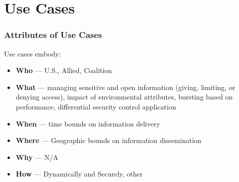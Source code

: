 \documentclass[t,handout]{beamer}
\begin{document}
\section{Use Cases}

\begin{frame}
\frametitle{Attributes of Use Cases}
Use cases embody:
\begin{itemize}
\item {\bf Who} --- U.S., Allied, Coalition
\item {\bf What} --- managing sensitive and open information (giving, limiting, or denying access), impact of environmental attributes, bursting based on performance, differential security control application
\item {\bf When} --- time bounds on information delivery
\item {\bf Where} --- Geographic bounds on information dissemination
\item {\bf Why} --- N/A
\item {\bf How} --- Dynamically and Securely, other
\end{itemize}
\end{frame}

\end{document}
